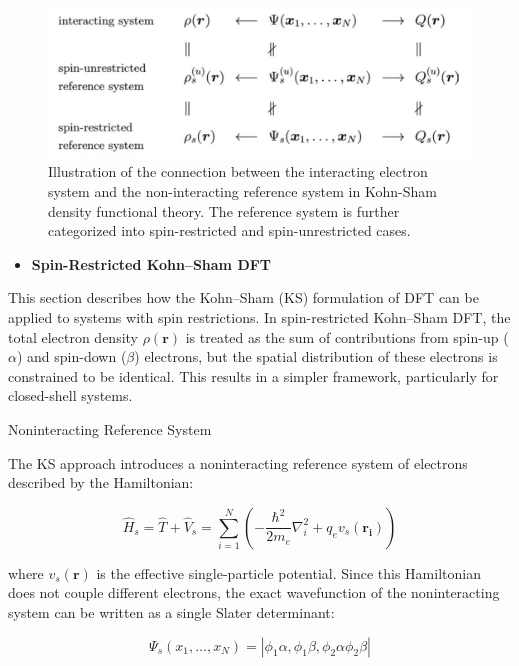 \documentclass[%
 preprint, linenumbers,
 amsmath,amssymb,
 aps, physrev,
]{revtex4-2}
\begin{document}
\begin{figure}[ht]
    \centering
    \includegraphics[width=0.8\linewidth]{Spin KS-DFT.png}
    \caption[Illustration of the connection between the interacting electron system and the non-interacting reference system in Kohn-Sham density functional theory.]{Illustration of the connection between the interacting electron system and the non-interacting reference system in Kohn-Sham density functional theory. The reference system is further categorized into spin-restricted and spin-unrestricted cases.}
    \label{fig:KS-DFT}
\end{figure}

\begin{itemize}
    \item  \textbf{Spin-Restricted Kohn–Sham DFT}
\end{itemize}

This section describes how the Kohn–Sham (KS) formulation of DFT can be applied to systems with spin restrictions. In spin-restricted Kohn–Sham DFT, the total electron density \( \rho(\mathbf{r}) \) is treated as the sum of contributions from spin-up (\( \alpha \)) and spin-down (\( \beta \)) electrons, but the spatial distribution of these electrons is constrained to be identical. This results in a simpler framework, particularly for closed-shell systems.

Noninteracting Reference System

The KS approach introduces a noninteracting reference system of electrons described by the Hamiltonian:


\begin{equation}
    \hat{H}_s = \hat{T} + \hat{V}_s = \sum_{i=1}^N \left( -\frac{\hbar^2}{2m_e} \nabla_i^2 + q_e v_s(\mathbf{r_i}) \right)
\end{equation}


where \( v_s(\mathbf{r}) \) is the effective single-particle potential. Since this Hamiltonian does not couple different electrons, the exact wavefunction of the noninteracting system can be written as a single Slater determinant:


\begin{equation}
    \Psi_s(x_1, \dots, x_N) = |\phi_1 \alpha,\phi_1\beta,\phi_2\alpha\phi_2\beta|
\end{equation}
\end{document}
